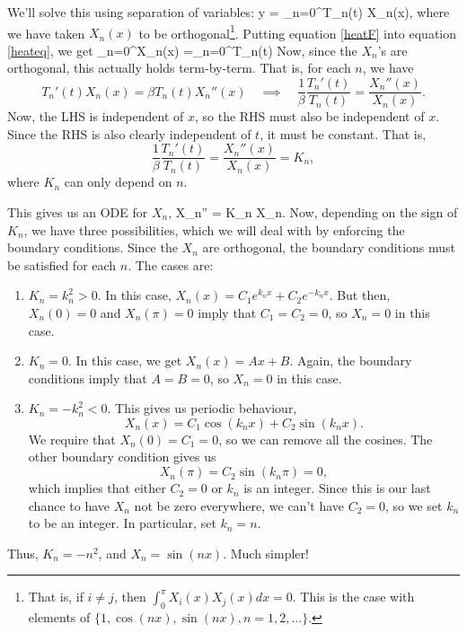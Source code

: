 \documentclass[12pt]{book}
\begin{document}
We'll solve this using separation of variables:
\be\label{heatF}
y = \sum_{n=0}^\infty T_n(t) X_n(x),
\ee
where we have taken $X_n(x)$ to be orthogonal\footnote{That is, if $i\neq j$,
then $\int_0^\pi X_i(x) X_j(x) dx =0.$ This is the case with elements of
$\{1,\cos(nx),\sin(nx),n=1,2,\dots \}$.}.
Putting equation \eqref{heatF} into equation \eqref{heateq}, we get
\be\label{heats}
\sum_{n=0}^\infty {}X_n(x)
=\beta\sum_{n=0}^\infty T_n(t)
\ee
Now, since the $X_n$'s are orthogonal, this actually holds term-by-term. That
is, for each $n$, we have
\begin{dmath*}[compact]
  T_n'(t)X_n(x) = \beta  T_n(t)X_n''(x)
  \quad \implies \quad
  \frac{1}{\beta}\frac{T_n'(t)}{T_n(t)}= \frac{X_n''(x)}{X_n(x)}.
\end{dmath*}
Now, the LHS is independent of $x$, so the RHS must also be independent of $x$.
Since the RHS is also clearly independent of $t$, it must be constant. That is,
\begin{dmath*}[compact]
  \frac{1}{\beta}\frac{T_n'(t)}{T_n(t)}
  = \frac{X_n''(x)}{X_n(x)} 
  = K_n,
\end{dmath*}
where $K_n$ can only depend on $n$.

This gives us an ODE for $X_n$,
\be
\label{Eigenfunction}
X_n'' = K_n X_n.
\ee
Now, depending on the sign of $K_n$, we have three possibilities, which we will
deal with by enforcing the boundary conditions. Since the $X_n$ are orthogonal,
the boundary conditions must be satisfied for each $n$. The cases are:
\begin{enumerate}
  \item $K_n=k_n^2 > 0$. In this case, $X_n(x)= C_1 e^{k_n x} +C_2 e^{-k_n x}$.
    But then, $X_n(0)=0$ and $X_n(\pi)=0$ imply that $C_1=C_2=0$, so $X_n=0$ in
    this case.
  \item $K_n = 0$. In this case, we get $X_n(x)=Ax +B$. Again, the boundary
    conditions imply that $A=B=0$, so $X_n=0$ in this case.
  \item $K_n =-k_n^2 < 0$. This gives us periodic behaviour,
    \begin{dmath*}
    X_n(x)=C_1\cos(k_nx) + C_2\sin(k_nx).
    \end{dmath*}
    We require that $X_n(0)=C_1=0$, so we can remove all the cosines. The
    other boundary condition gives us
    \begin{dmath*}
    X_n(\pi)=C_2\sin(k_n\pi)=0,
    \end{dmath*}
    which implies that either $C_2=0$ or $k_n$ is an integer. Since this is
    our last chance to have $X_n$ not be zero everywhere, we can't have $C_2=0$,
    so we set $k_n$ to be an integer. In particular, set $k_n=n$.
\end{enumerate}
Thus, $K_n=-n^2$, and $X_n= \sin(nx)$. Much simpler!
\end{document}

